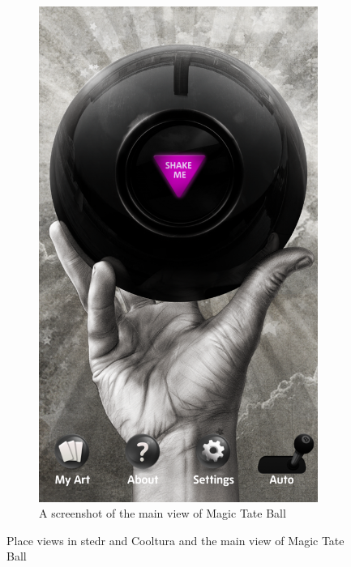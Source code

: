 \begin{figure}[h]
	\hspace{0.5cm}	
	\begin{subfigure}[t]{0.3\textwidth}
		\includegraphics[width=\textwidth]{fig/tateball_screenshot}
		\caption{A screenshot of the main view of Magic Tate Ball}
		\label{Fig:tateball_screenshot}		
	\end{subfigure}	
	\caption{Place views in stedr and Cooltura and the main view of Magic Tate Ball}
\end{figure}


